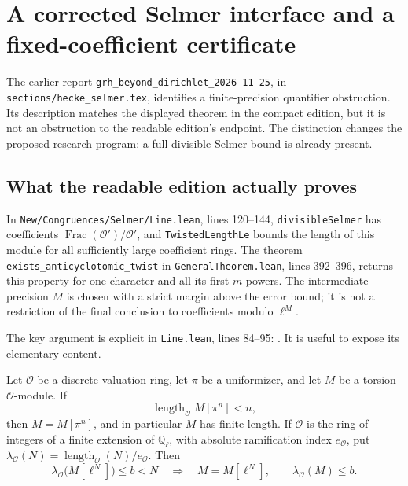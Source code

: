 \section{A corrected Selmer interface and a fixed-coefficient certificate}
\label{sec:sha-odd-bridge}

The earlier report \texttt{grh\_beyond\_dirichlet\_2026-11-25}, in
\texttt{sections/hecke\_selmer.tex}, identifies a finite-precision
quantifier obstruction. Its description matches the displayed theorem
in the compact edition, but it is not an obstruction to the readable
edition's endpoint. The distinction changes the proposed research
program: a full divisible Selmer bound is already present.

\subsection{What the readable edition actually proves}

In \texttt{New/Congruences/Selmer/Line.lean}, lines 120--144,
\texttt{divisibleSelmer} has coefficients
\(\operatorname{Frac}(\mathcal O')/\mathcal O'\), and
\texttt{TwistedLengthLe} bounds the length of this module for all
sufficiently large coefficient rings. The theorem
\texttt{exists\_anticyclotomic\_twist} in
\texttt{GeneralTheorem.lean}, lines 392--396, returns this property for
one character and all its first \(m\) powers. The intermediate precision
\(M\) is chosen with a strict margin above the error bound; it is not a
restriction of the final conclusion to coefficients modulo \(\ell^M\).

The key argument is explicit in
\texttt{Line.lean}, lines 84--95:
. It is useful to expose
its elementary content.

\begin{proposition}
\label{prop:one-level-saturation}
Let \(\mathcal O\) be a discrete valuation ring, let \(\pi\) be a
uniformizer, and let \(M\) be a torsion \(\mathcal O\)-module. If
\[
  \operatorname{length}_{\mathcal O}M[\pi^n]<n,
\]
then \(M=M[\pi^n]\), and in particular \(M\) has finite length.
If \(\mathcal O\) is the ring of integers of a finite extension of
\(\mathbb Q_\ell\), with absolute ramification index \(e_{\mathcal O}\),
put
\(\lambda_{\mathcal O}(N)=
\operatorname{length}_{\mathcal O}(N)/e_{\mathcal O}\).
Then
\[
 \lambda_{\mathcal O}\bigl(M[\ell^N]\bigr)\leq b<N
 \quad\Longrightarrow\quad
 M=M[\ell^N],\qquad \lambda_{\mathcal O}(M)\leq b.
\]
\end{proposition}

